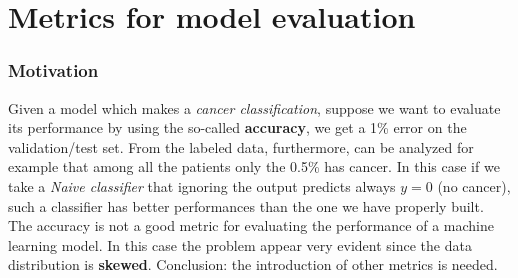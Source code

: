 \begin{figure}[h]
    \centering 
\end{figure}

\section{Metrics for model evaluation}
\subsubsection{Motivation}
Given a model which makes a \textit{cancer classification}, suppose we want to evaluate its performance by using the so-called \textbf{accuracy}, we get a 1\% error on the validation/test set. From the labeled data, furthermore, can be analyzed for example that among all the patients only the 0.5\% has cancer. In this case if we take a \textit{Naive classifier} that ignoring the output predicts always $y=0$ (no cancer), such a classifier has better performances than the one we have properly built. The accuracy is not a good metric for evaluating the performance of a machine learning model. In this case the problem appear very evident since the data distribution is \textbf{skewed}. Conclusion: the introduction of other metrics is needed. 

